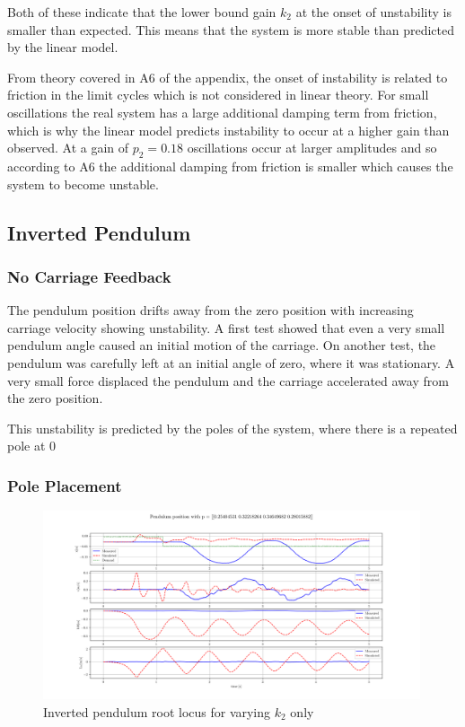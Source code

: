 \documentclass{article}
\begin{document}
Both of these indicate that the lower bound gain $k_2$ at the onset of unstability is smaller than expected. This means that the system is more stable than predicted by the linear model.

From theory covered in A6 of the appendix, the onset of instability is related to friction in the limit cycles which is not considered in linear theory.
For small oscillations the real system has a large additional damping term from friction, which is why the linear model predicts instability to occur at a higher gain than observed.
At a gain of $p_2 = 0.18$ oscillations occur at larger amplitudes and so according to A6 the additional damping from friction is smaller which causes the system to become unstable.

\subsection{Inverted Pendulum}

\subsubsection{No Carriage Feedback}

The pendulum position drifts away from the zero position with increasing carriage velocity showing unstability.
A first test showed that even a very small pendulum angle caused an initial motion of the carriage.
On another test, the pendulum was carefully left at an initial angle of zero, where it was stationary.
A very small force displaced the pendulum and the carriage accelerated away from the zero position. 

This unstability is predicted by the poles of the system, where there is a repeated pole at 0


\subsubsection{Pole Placement}
\begin{figure}[H]
  \centering
  \includegraphics[width=0.99\textwidth]{figures/4.3.png}
  \caption{Inverted pendulum root locus for varying $k_2$ only}
  \label{fig:4.3}
\end{figure}
\end{document}

